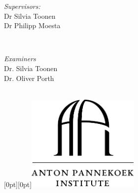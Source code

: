 \begin{titlepage}

\begin{minipage}{0.4\textwidth}
\begin{flushleft} \large
{\large \emph{Supervisors:}}\\

\large{Dr Silvia Toonen}\\ %
\large{Dr Philipp Moesta}
\end{flushleft}
\end{minipage}
~
\begin{minipage}{0.4\textwidth}
\begin{flushright} \large
\emph{Examiners} \\
\large{Dr. Silvia Toonen} \\
\large{Dr. Oliver Porth} %
\end{flushright}
\end{minipage}\\



\raisebox{-138pt}[0pt][0pt]{\includegraphics[width=5.5cm]{Thesis/logos/api_logo.pdf}}\\ %




\vfill 

\end{titlepage}

\newpage

\mbox{}


